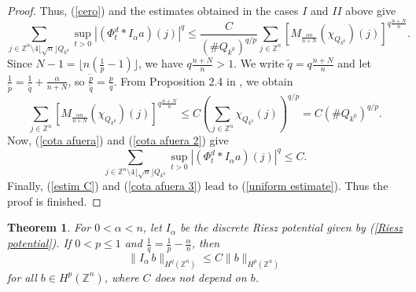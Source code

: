 \documentclass[leqno,12pt]{article} %
\theoremstyle{plain} %
\newtheorem{theorem}{\indent\sc Theorem}[section]
\theoremstyle{definition} %
\begin{document}
\begin{proof}
Thus, (\ref{cero}) and the estimates obtained in the cases $I$ and $II$ above give
\begin{equation} \label{cota afuera}
\sum_{j \in \mathbb{Z}^n \setminus 4\lfloor \sqrt{n} \rfloor Q_{k^0}} \sup_{t>0}|(\Phi^{d}_{t} \ast I_{\alpha}a)(j)|^q \leq 
\frac{C}{(\# Q_{k^0})^{q/p}} \sum_{j \in \mathbb{Z}^n} \left[ M_{\frac{\alpha n}{n+N}} (\chi_{Q_{k^0}})(j) \right]^{q \frac{n+N}{n}}.
\end{equation}
Since  $N-1= \lfloor n(\frac{1}{p}-1) \rfloor$, we have $q \frac{n+N}{n} > 1$. We write $\widetilde{q} = q \frac{n+N}{n}$ and let 
$\frac{1}{\widetilde{p}} = \frac{1}{\widetilde{q}} + \frac{\alpha}{n+N}$, so $\frac{\widetilde{p}}{\widetilde{q}} = \frac{p}{q}$. From
Proposition 2.4 in \cite{PRocha}, we obtain
\begin{equation} \label{cota afuera 2}
\sum_{j \in \mathbb{Z}^n} \left[ M_{\frac{\alpha n}{n+N}} (\chi_{Q_{k^0}})(j) \right]^{q \frac{n+N}{n}} \leq
C \left( \sum_{j \in \mathbb{Z}^n} \chi_{Q_{k^0}}(j) \right)^{q/p} = C (\# Q_{k^0})^{q/p}.
\end{equation}
Now, (\ref{cota afuera}) and (\ref{cota afuera 2}) give
\begin{equation} \label{cota afuera 3}
\sum_{j \in \mathbb{Z}^n \setminus 4\lfloor \sqrt{n} \rfloor Q_{k^0}} \sup_{t>0}|(\Phi^{d}_{t} \ast I_{\alpha}a)(j)|^q \leq C.
\end{equation}
Finally, (\ref{estim C}) and (\ref{cota afuera 3}) lead to (\ref{uniform estimate}). Thus the proof is finished.
\end{proof}

\begin{theorem} \label{main result}
For $0 < \alpha < n$, let $I_{\alpha}$ be the discrete Riesz potential given by (\ref{Riesz potential}). If
$0 < p \leq 1$ and $\frac{1}{q} = \frac{1}{p} - \frac{\alpha}{n}$, then
\[
\| I_{\alpha} \, b \|_{H^{q}(\mathbb{Z}^n)} \leq C \| b \|_{H^{p}(\mathbb{Z}^n)}
\]
for all $b \in H^{p}(\mathbb{Z}^n)$, where $C$ does not depend on $b$.
\end{theorem}
\end{document}
